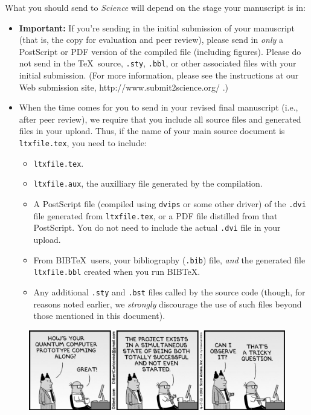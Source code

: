 \documentclass[12pt]{article}
\begin{document}
What you should send to {\it Science\/} will depend on the stage your manuscript is in:

\begin{itemize}
\item {\bf Important:} If you're sending in the initial submission of
your manuscript (that is, the copy for evaluation and peer review),
please send in {\it only\/} a PostScript or PDF version of the
compiled file (including figures).  Please do not send in the \TeX\ 
source, \texttt{.sty}, \texttt{.bbl}, or other associated files with
your initial submission.  (For more information, please see the
instructions at our Web submission site,
http://www.submit2science.org/ .)
\item When the time comes for you to send in your revised final
manuscript (i.e., after peer review), we require that you include
all source files and generated files in your upload.  Thus, if the
name of your main source document is \texttt{ltxfile.tex}, you
need to include:
\begin{itemize}
\item \texttt{ltxfile.tex}.
\item \texttt{ltxfile.aux}, the auxilliary file generated by the
compilation.
\item A PostScript file (compiled using \texttt{dvips} or some other
driver) of the \texttt{.dvi} file generated from
\texttt{ltxfile.tex}, or a PDF file distilled from that
PostScript.  You do not need to include the actual \texttt{.dvi}
file in your upload.
\item From B{\small{IB}}\TeX\ users, your bibliography (\texttt{.bib})
file, {\it and\/} the generated file \texttt{ltxfile.bbl} created
when you run B{\small{IB}}\TeX.
\item Any additional \texttt{.sty} and \texttt{.bst} files called by
the source code (though, for reasons noted earlier, we {\it
strongly\/} discourage the use of such files beyond those
mentioned in this document).
\end{itemize}
\end{itemize}

\begin{figure}
\includegraphics[scale=.5]{dilbert}
\centering
\end{figure}
\end{document}
